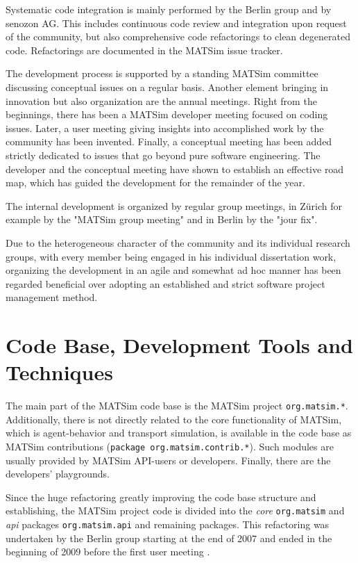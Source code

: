 Systematic code integration is mainly performed by the Berlin group and by senozon AG. This includes continuous code review and integration upon request of the community, but also comprehensive code refactorings to clean degenerated code. Refactorings are documented in the MATSim issue tracker.

The development process is supported by a standing MATSim committee discussing conceptual issues on a regular basis. Another element bringing in innovation but also organization are the annual meetings. Right from the beginnings, there has been a MATSim developer meeting focused on coding issues. Later, a user meeting giving insights into accomplished work by the community has been invented. Finally, a conceptual meeting has been added strictly dedicated to issues that go beyond pure software engineering. The developer and the conceptual meeting have shown to establish an effective road map, which has guided the development for the remainder of the year. 

The internal development is organized by regular group meetings, in Zürich for example by the "MATSim group meeting" and in Berlin by the "jour fix". 

Due to the heterogeneous character of the community and its individual research groups, with every member being engaged in his individual dissertation work, organizing the development in an agile and somewhat ad hoc manner has been regarded beneficial over adopting an established and strict software project management method.

\section{Code Base, Development Tools and Techniques}
The main part of the MATSim code base is the MATSim project \lstinline|org.matsim.*|. Additionally, there is not directly related to the core functionality of MATSim, which is agent-behavior and transport simulation, is available in the code base as MATSim contributions (\lstinline|package org.matsim.contrib.*|). Such modules are usually provided by MATSim API-users or developers. Finally, there are the developers' playgrounds.

Since the huge refactoring greatly improving the code base structure and establishing, the MATSim project code is divided into the \emph{core} \lstinline|org.matsim| and \emph{api} packages \lstinline|org.matsim.api| and remaining packages. This refactoring was undertaken by the Berlin group starting at the end of 2007 and ended in the beginning of 2009 before the first user meeting .

